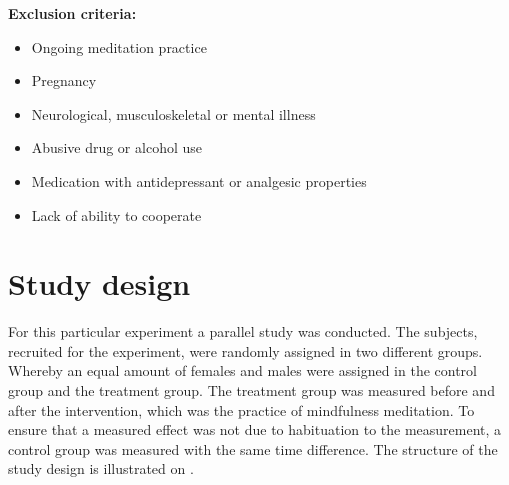 \textbf{Exclusion criteria:}
\vspace{-.5cm}
\begin{itemize}
	\item Ongoing meditation practice 
	\vspace{-.3cm}
	\item Pregnancy 
	\vspace{-.3cm}
	\item Neurological, musculoskeletal or mental illness
	\vspace{-.3cm}
	\item Abusive drug or alcohol use 
		\vspace{-.3cm}
			\item Medication with antidepressant or analgesic properties
\vspace{-.3cm}
	\item Lack of ability to cooperate
\end{itemize}

\vspace{-.5cm}

\section{Study design} 
For this particular experiment a parallel study was conducted. The subjects, recruited for the experiment, were randomly assigned in two different groups. Whereby an equal amount of females and males were assigned in the control group and the treatment group. The treatment group was measured before and after the intervention, which was the practice of mindfulness meditation. To ensure that a measured effect was not due to habituation to the measurement, a control group was measured with the same time difference. The structure of the study design is illustrated on .


